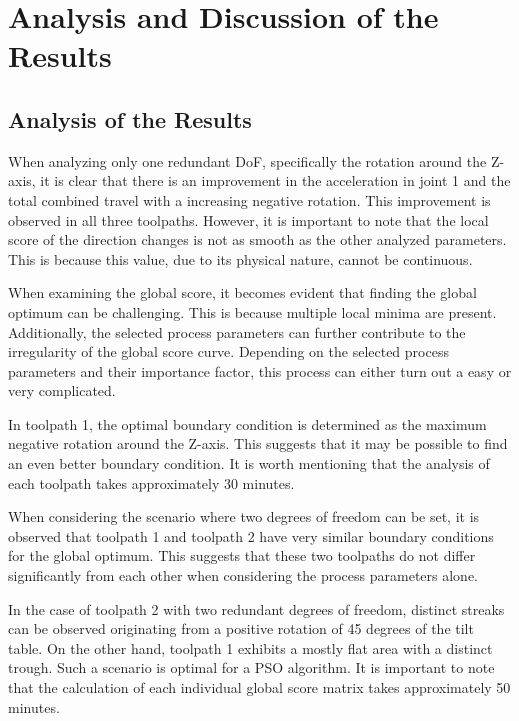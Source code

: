 \newpage
\section{Analysis and Discussion of the Results}%

\subsection{Analysis of the Results}
When analyzing only one redundant \acrshort{DoF}, specifically the rotation around the Z-axis, it is clear that there is an improvement in the acceleration in joint 1 and the total combined travel with a increasing negative rotation. This improvement is observed in all three toolpaths. However, it is important to note that the local score of the direction changes is not as smooth as the other analyzed parameters. This is because this value, due to its physical nature, cannot be continuous.

When examining the global score, it becomes evident that finding the global optimum can be challenging. This is because multiple local minima are present. Additionally, the selected process parameters can further contribute to the irregularity of the global score curve.
Depending on the selected process parameters and their importance factor, this process can either turn out a easy or very complicated.

In toolpath 1, the optimal boundary condition is determined as the maximum negative rotation around the Z-axis. This suggests that it may be possible to find an even better boundary condition.
It is worth mentioning that the analysis of each toolpath takes approximately 30 minutes.


When considering the scenario where two degrees of freedom can be set, it is observed that toolpath 1 and toolpath 2 have very similar boundary conditions for the global optimum. This suggests that these two toolpaths do not differ significantly from each other when considering the process parameters alone.

In the case of toolpath 2 with two redundant degrees of freedom, distinct streaks can be observed originating from a positive rotation of 45 degrees of the tilt table.
On the other hand, toolpath 1 exhibits a mostly flat area with a distinct trough. Such a scenario is optimal for a \acrshort{PSO} algorithm.
It is important to note that the calculation of each individual global score matrix takes approximately 50 minutes. 



